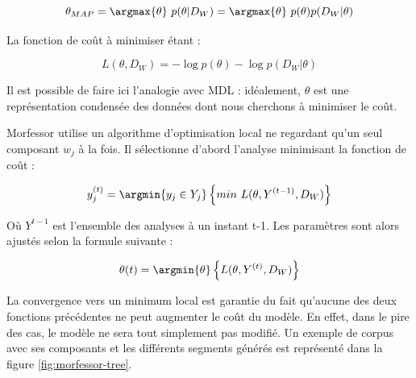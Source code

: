 \documentclass[12pt,a4paper,times,twoside,openright]{report}
\begin{document}
\begin{equation}
\theta_{MAP} = \argmax{\theta}\ p(\theta | D_{W}) = \argmax{\theta}\ p(\theta)p(D_{W} | \theta)
\end{equation}

La fonction de coût à minimiser étant :

\begin{equation}\label{eq:L-theta}
L(\theta, D_{W}) = -\log p(\theta) - \log p(D_{W} | \theta)
\end{equation}

Il est possible de faire ici l'analogie avec MDL : idéalement, $\theta$ est une représentation condensée des données dont nous cherchons à minimiser le coût.

Morfessor utilise un algorithme d'optimisation local ne regardant qu'un seul composant $w_{j}$ à la fois. Il sélectionne d'abord l'analyse minimisant la fonction de coût :

\begin{equation}
y^{(t)}_{j} = \argmin{y_{j} \in Y_{j}} \left \{ min\ L(\theta, Y^{(t-1)}, D_{W}) \right \}
\end{equation}

Où $Y^{t-1}$ est l'ensemble des analyses à un instant t-1. Les paramètres sont alors ajustés selon la formule suivante :

\begin{equation}
\theta(t) = \argmin{\theta} \left \{ L(\theta, Y^{(t)}, D_{W}) \right \}
\end{equation}

La convergence vers un minimum local est garantie du fait qu'aucune des deux fonctions précédentes ne peut augmenter le coût du modèle. En effet, dans le pire des cas, le modèle ne sera tout simplement pas modifié. Un exemple de corpus avec ses composants et les différents segments générés est représenté dans la figure \ref{fig:morfessor-tree}.
\end{document}
